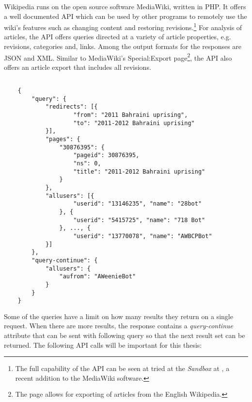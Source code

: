 Wikipedia runs on the open source software MediaWiki, written in \ac{PHP}.
It offers a well documented \ac{API} which can be used by other programs to remotely use the wiki's features such as changing content and restoring revisions.\footnote{The full capability of the \ac{API} can be seen at tried at the \emph{Sandbox} at , a recent addition to the MediaWiki software.}
For analysis of articles, the \ac{API} offers queries directed at a variety of article properties, e.g. revisions, categories and, links.
Among the output formats for the responses are \ac{JSON} and \ac{XML}.
Similar to MediaWiki's Special:Export page\footnote{The page  allows for exporting of articles from the English Wikipedia.}, the \ac{API} also offers an article export that includes all revisions.
\begin{lstlisting}

	{
		"query": {
			"redirects": [{
					"from": "2011 Bahraini uprising",
					"to": "2011-2012 Bahraini uprising"
			}],
			"pages": {
				"30876395": {
					"pageid": 30876395,
					"ns": 0,
					"title": "2011-2012 Bahraini uprising"
				}
			},
			"allusers": [{
					"userid": "13146235", "name": "28bot"
				}, {
					"userid": "5415725", "name": "718 Bot"
				}, ..., {
					"userid": "13770078", "name": "AWBCPBot"
			}]
		},
		"query-continue": {
			"allusers": {
				"aufrom": "AWeenieBot"
			}
		}
	}
\end{lstlisting}

Some of the queries have a limit on how many results they return on a single request.
When there are more results, the response contains a \emph{query-continue} attribute that can be sent with following query so that the next result set can be returned.
The following \ac{API} calls will be important for this thesis:

